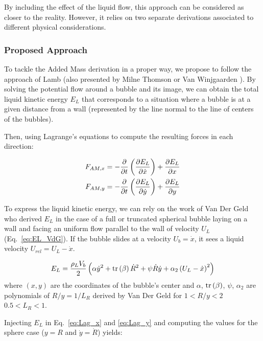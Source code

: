 By including the effect of the liquid flow, this approach can be considered as closer to the reality. However, it relies on two separate derivations associated to different physical considerations.

\subsubsection{Proposed Approach}
\label{subsubsec:new_AM}

To tackle the Added Mass derivation in a proper way, we propose to follow the approach of Lamb \cite{lamb_hydrodynamics_1895} (also presented by Milne Thomson \cite{milne-thomson_theoretical_1938} or Van Winjgaarden \cite{wijngaarden_hydrodynamic_1976}). By solving the potential flow around a bubble and its image, we can obtain the total liquid kinetic energy $E_{L}$ that corresponds to a situation where a bubble is at a given distance from a wall (represented by the line normal to the line of centers of the bubbles). 

Then, using Lagrange's equations to compute the resulting forces in each direction:


\begin{align}
\label{eq:Lag_x}
F_{AM,x}&=-\frac{\partial }{\partial t}\left( \frac{\partial E_{L}}{\partial \dot{x}} \right)+\frac{\partial E_{L}}{\partial x}\\
\label{eq:Lag_y}
F_{AM,y}&=-\frac{\partial }{\partial t}\left( \frac{\partial E_{L}}{\partial \dot{y}} \right)+\frac{\partial E_{L}}{\partial y}
\end{align}


To express the liquid kinetic energy, we can rely on the work of Van Der Geld \cite{van_der_geld_dynamics_2009} who derived $E_{L}$ in the case of a full or truncated spherical bubble laying on a wall and facing an uniform flow parallel to the wall of velocity $U_{L}$ (Eq.~\ref{eq:EL_VdG}). If the bubble slides at a velocity $U_{b}=\dot{x}$, it sees a liquid velocity $U_{rel}=U_{L}-\dot{x}$.

\begin{align}
E_{L}=\frac{\rho_{L}V_{b}}{2}\left( \alpha \dot{y}^{2} +\mathrm{tr}\left( \beta \right)\dot{R}^{2}+\psi \dot{R}\dot{y} +\alpha_{2} \left( U_{L}-\dot{x} \right)^{2}  \right)
\label{eq:EL_VdG}
\end{align}
where $(x,y)$ are the coordinates of the bubble's center and $\alpha$, $\mathrm{tr}\left( \beta \right)$, $\psi$, $\alpha_{2}$ are polynomials of $R/y = 1/L_{R}$ derived by Van Der Geld for $1<R/y<2$ \ie $0.5<L_{R}<1$.



Injecting $E_{L}$ in Eq.~\ref{eq:Lag_x} and \ref{eq:Lag_y} and computing the values for the sphere case ($y=R$ and $\dot{y} = \dot{R}$) yields:

